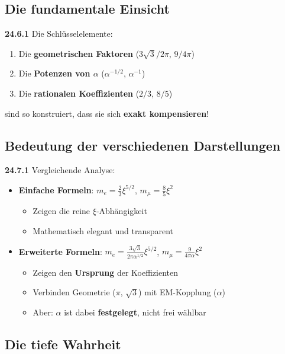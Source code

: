 \documentclass[12pt,a4paper]{article}
\begin{document}
\subsection{Die fundamentale Einsicht}

\noindent \textbf{24.6.1} Die Schlüsselelemente:
\begin{enumerate}
	\item Die \textbf{geometrischen Faktoren} ($3\sqrt{3}/2\pi$, $9/4\pi$)
	\item Die \textbf{Potenzen von $\alpha$} ($\alpha^{-1/2}$, $\alpha^{-1}$)  
	\item Die \textbf{rationalen Koeffizienten} ($2/3$, $8/5$)
\end{enumerate}

\noindent sind so konstruiert, dass sie sich \textbf{exakt kompensieren}!

\subsection{Bedeutung der verschiedenen Darstellungen}

\noindent \textbf{24.7.1} Vergleichende Analyse:
\begin{itemize}
	\item \textbf{Einfache Formeln}: $m_e = \frac{2}{3}\xi^{5/2}$, $m_\mu = \frac{8}{5}\xi^2$
	\begin{itemize}
		\item Zeigen die reine $\xi$-Abhängigkeit
		\item Mathematisch elegant und transparent
	\end{itemize}
	
	\item \textbf{Erweiterte Formeln}: $m_e = \frac{3\sqrt{3}}{2\pi\alpha^{1/2}}\xi^{5/2}$, $m_\mu = \frac{9}{4\pi\alpha}\xi^2$
	\begin{itemize}
		\item Zeigen den \textbf{Ursprung} der Koeffizienten
		\item Verbinden Geometrie ($\pi$, $\sqrt{3}$) mit EM-Kopplung ($\alpha$)
		\item Aber: $\alpha$ ist dabei \textbf{festgelegt}, nicht frei wählbar
	\end{itemize}
\end{itemize}

\subsection{Die tiefe Wahrheit}
\end{document}
